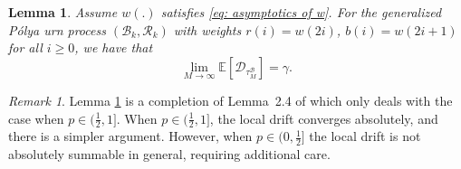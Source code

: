 \documentclass[twoside,12pt, a4paper, final]{article}
\newtheorem{lemma}{Lemma}[section]
\numberwithin{equation}{section}
\theoremstyle{remark}
\newtheorem{remark}{Remark}[section]
\begin{document}
	\begin{lemma} \label{lm: convergence of mean of discrepancies}
		Assume $w(.)$ satisfies \eqref{eq: asymptotics of w}.
		For the generalized P\'{o}lya urn process $(\mathcal{B}_{k},\mathcal{R}_{k})$ with weights $r(i)= w(2i)$, $b(i) = w(2i+1)$ for all $i\geq 0$, we have that
		$$
		\lim_{M\to\infty} \mathbb{E}[\mathcal{D}_{\tau_M^{\mathcal{B}}}] = \gamma. 
		$$
	\end{lemma} 
	\begin{remark}
		Lemma \ref{lm: convergence of mean of discrepancies} is a completion of Lemma~2.4 of \cite{KMP23} which only deals with the case when ${p \in (\frac{1}{2}, 1]}$. When $p \in (\frac{1}{2}, 1]$, the local drift converges absolutely, and there is a simpler argument. However, when $p \in (0,\frac{1}{2}]$ the local drift is not absolutely summable in general, requiring additional care.
	\end{remark}
\end{document}
